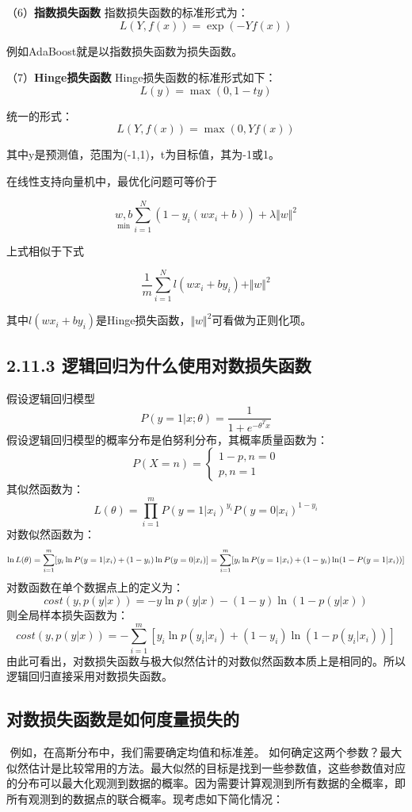 （6）\textbf{指数损失函数} 指数损失函数的标准形式为： \[
L(Y, f(x)) = \exp(-Yf(x))
\]

例如AdaBoost就是以指数损失函数为损失函数。

（7）\textbf{Hinge损失函数} Hinge损失函数的标准形式如下： \[
L(y) = \max{(0, 1-ty)}
\]

统一的形式： \[
L(Y, f(x)) = \max{(0, Yf(x))}
\]

其中y是预测值，范围为(-1,1)，t为目标值，其为-1或1。

在线性支持向量机中，最优化问题可等价于

\[
\underset{\min}{w,b}\sum_{i=1}^N (1-y_i(wx_i+b))+\lambda\Vert w\Vert ^2
\]

上式相似于下式

\[
\frac{1}{m}\sum_{i=1}^{N}l(wx_i+by_i) + \Vert w\Vert ^2
\]

其中$l(wx_i+by_i)$是Hinge损失函数，$\Vert w\Vert ^2$可看做为正则化项。

\subsection{2.11.3
逻辑回归为什么使用对数损失函数}\label{ux903bux8f91ux56deux5f52ux4e3aux4ec0ux4e48ux4f7fux7528ux5bf9ux6570ux635fux5931ux51fdux6570}

假设逻辑回归模型 \[
P(y=1|x;\theta)=\frac{1}{1+e^{-\theta^{T}x}}
\] 假设逻辑回归模型的概率分布是伯努利分布，其概率质量函数为： \[
P(X=n)=
\begin{cases}
1-p, n=0\\
 p,n=1
\end{cases}
\] 其似然函数为： \[
L(\theta)=\prod_{i=1}^{m}
P(y=1|x_i)^{y_i}P(y=0|x_i)^{1-y_i}
\] 对数似然函数为： \[
\ln L(\theta)=\sum_{i=1}^{m}[y_i\ln{P(y=1|x_i)}+(1-y_i)\ln{P(y=0|x_i)}]\\
  =\sum_{i=1}^m[y_i\ln{P(y=1|x_i)}+(1-y_i)\ln(1-P(y=1|x_i))]
\] 对数函数在单个数据点上的定义为： \[
cost(y,p(y|x))=-y\ln{p(y|x)-(1-y)\ln(1-p(y|x))}
\] 则全局样本损失函数为： \[
cost(y,p(y|x)) = -\sum_{i=1}^m[y_i\ln p(y_i|x_i)+(1-y_i)\ln(1-p(y_i|x_i))]
\]
由此可看出，对数损失函数与极大似然估计的对数似然函数本质上是相同的。所以逻辑回归直接采用对数损失函数。

\subsection{对数损失函数是如何度量损失的}\label{ux5bf9ux6570ux635fux5931ux51fdux6570ux662fux5982ux4f55ux5ea6ux91cfux635fux5931ux7684}

​ 例如，在高斯分布中，我们需要确定均值和标准差。 ​
如何确定这两个参数？最大似然估计是比较常用的方法。最大似然的目标是找到一些参数值，这些参数值对应的分布可以最大化观测到数据的概率。
​
因为需要计算观测到所有数据的全概率，即所有观测到的数据点的联合概率。现考虑如下简化情况：

